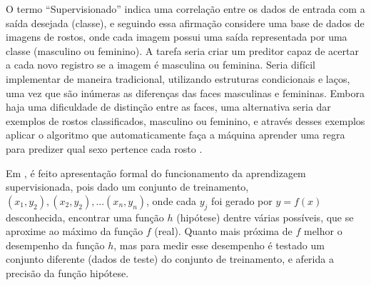 
O termo ``Supervisionado'' indica uma correlação entre os dados de entrada com a saída desejada (classe), e seguindo essa afirmação considere uma base de dados de imagens de rostos, onde cada imagem possui uma saída representada por uma classe (masculino ou feminino). A tarefa seria criar um preditor capaz de acertar a cada novo registro se a imagem é masculina ou feminina. Seria difícil implementar de maneira tradicional, utilizando estruturas condicionais e laços, uma vez que são inúmeras as diferenças das faces masculinas e femininas. Embora haja uma dificuldade de distinção entre as faces, uma alternativa seria dar exemplos de rostos classificados, masculino ou feminino,  e através desses exemplos aplicar o algoritmo que automaticamente faça a máquina aprender uma regra para predizer qual sexo pertence cada rosto  \cite{Barber2011}.

Em \cite{RusselStuart.Norvig2013}, é feito apresentação formal do funcionamento da aprendizagem supervisionada, pois dado um conjunto de treinamento, 
${(x_{1},y_{2}),(x_{2},y_{2}),...(x_{n},y_{n})}$, onde cada ${y_{j}} $ foi gerado por ${y=f(x)}$ desconhecida, encontrar uma função ${h}$ (hipótese) dentre várias possíveis, que se aproxime ao máximo da função ${f}$ (real). Quanto mais próxima de ${f}$ melhor o desempenho da função ${h}$, mas para medir esse desempenho é testado um conjunto diferente (dados de teste) do conjunto de treinamento, e aferida a precisão da função hipótese.  

